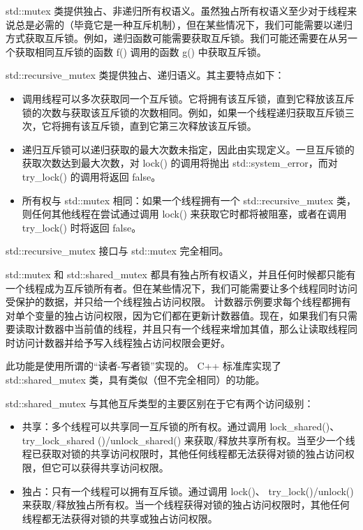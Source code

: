 
std::mutex 类提供独占、非递归所有权语义。虽然独占所有权语义至少对于线程来说总是必需的（毕竟它是一种互斥机制），但在某些情况下，我们可能需要以递归方式获取互斥锁。例如，递归函数可能需要获取互斥锁。我们可能还需要在从另一个获取相同互斥锁的函数 f() 调用的函数 g() 中获取互斥锁。

std::recursive\_mutex 类提供独占、递归语义。其主要特点如下：

\begin{itemize}
\item
调用线程可以多次获取同一个互斥锁。它将拥有该互斥锁，直到它释放该互斥锁的次数与获取该互斥锁的次数相同。例如，如果一个线程递归获取互斥锁三次，它将拥有该互斥锁，直到它第三次释放该互斥锁。

\item
递归互斥锁可以递归获取的最大次数未指定，因此由实现定义。一旦互斥锁的获取次数达到最大次数，对 lock() 的调用将抛出 std::system\_error，而对 try\_lock() 的调用将返回 false。

\item
所有权与 std::mutex 相同：如果一个线程拥有一个 std::recursive\_mutex 类，则任何其他线程在尝试通过调用 lock() 来获取它时都将被阻塞，或者在调用 try\_lock() 时将返回 false。
\end{itemize}

std::recursive\_mutex 接口与 std::mutex 完全相同。


std::mutex 和 std::shared\_mutex 都具有独占所有权语义，并且任何时候都只能有一个线程成为互斥锁所有者。但在某些情况下，我们可能需要让多个线程同时访问受保护的数据，并只给一个线程独占访问权限。
计数器示例要求每个线程都拥有对单个变量的独占访问权限，因为它们都在更新计数器值。现在，如果我们有只需要读取计数器中当前值的线程，并且只有一个线程来增加其值，那么让读取线程同时访问计数器并给予写入线程独占访问权限会更好。

此功能是使用所谓的“读者-写者锁”实现的。 C++ 标准库实现了 std::shared\_mutex 类，具有类似（但不完全相同）的功能。

std::shared\_mutex 与其他互斥类型的主要区别在于它有两个访问级别：

\begin{itemize}
\item
共享：多个线程可以共享同一互斥锁的所有权。通过调用 lock\_shared()、 try\_lock\_shared ()/unlock\_shared() 来获取/释放共享所有权。当至少一个线程已获取对锁的共享访问权限时，其他任何线程都无法获得对锁的独占访问权限，但它可以获得共享访问权限。

\item
独占：只有一个线程可以拥有互斥锁。通过调用 lock()、 try\_lock()/unlock() 来获取/释放独占所有权。当一个线程获得对锁的独占访问权限时，其他任何线程都无法获得对锁的共享或独占访问权限。
\end{itemize}

